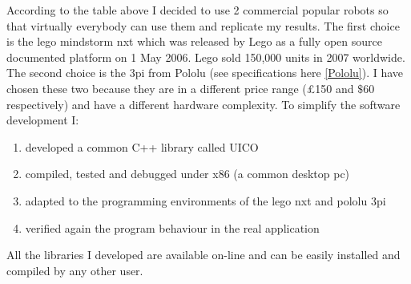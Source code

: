 According to the table above I decided to use 2 commercial popular robots so that virtually everybody can use them and replicate my results. The first choice is the lego mindstorm nxt which was released by Lego as a fully open source documented platform on 1 May 2006. Lego sold 150,000 units in 2007 worldwide. The second choice is the 3pi from Pololu (see specifications here \ref{Pololu}).
I have chosen these two because they are in a different price range (£150 and $\$60$ respectively) and have a different hardware complexity.
To simplify the software development I:
\begin{enumerate}
 \item developed a common C++ library called UICO
 \item compiled, tested and debugged under x86 (a common desktop pc)
 \item adapted to the programming environments of the lego nxt and pololu 3pi
 \item verified again the program behaviour in the real application
\end{enumerate}

All the libraries I developed are available on-line and can be easily installed and compiled by any other user.


